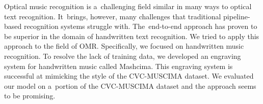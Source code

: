 \documentclass[12pt]{report}
\begin{document}

Optical music recognition is a~challenging field similar in many ways to optical text recognition. It~brings, however, many challenges that traditional pipeline-based recognition systems struggle with. The~end-to-end approach has proven to be superior in the domain of handwritten text recognition. We tried to apply this approach to the field of OMR. Specifically, we focused on handwritten music recognition. To resolve the lack of training data, we developed an engraving system for handwritten music called Mashcima. This engraving system is successful at mimicking the style of the CVC-MUSCIMA dataset. We evaluated our model on a~portion of the CVC-MUSCIMA dataset and the approach seems to be promising.
\end{document}
